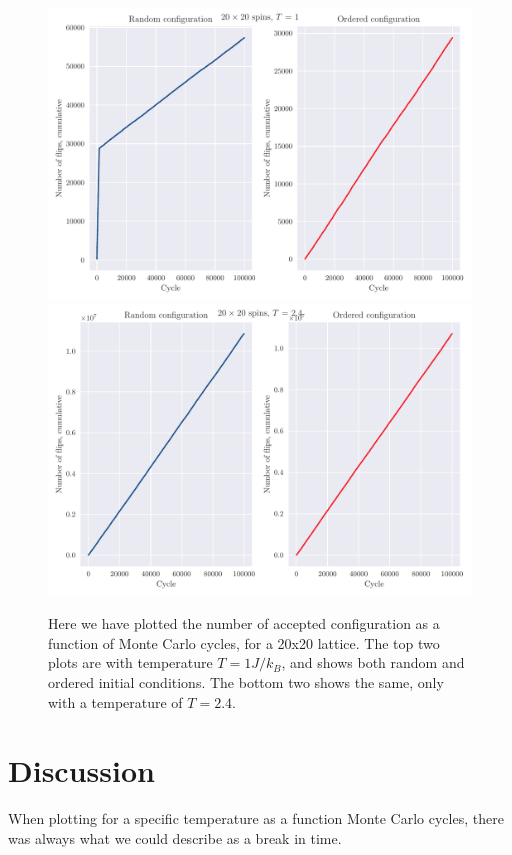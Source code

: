 \documentclass[reprint, english,notitlepage,nofootinbib]{revtex4-1}  %
\begin{document}
\begin{figure}[!htb]
	\includegraphics[width=16cm]{../output/de/L20-T1-dT0_0-NT1-N5-NumFlips.pdf}
	\includegraphics[width=16cm]{../output/de/L20-T2_4-dT0_0-NT1-N5-NumFlips.pdf}
	\caption{Here we have plotted the number of accepted configuration as a function of Monte Carlo cycles, for a 20x20 lattice. The top two plots are with temperature $T=1J/k_B$, and shows both random and ordered initial conditions. The bottom two shows the same, only with a temperature of $T = 2.4$.}
	\label{fig:Num_flips_T1_and_T2_4}
\end{figure}

\section{Discussion}

When plotting for a specific temperature as a function Monte Carlo cycles, there was always what we could describe as a break in time.
\end{document}
